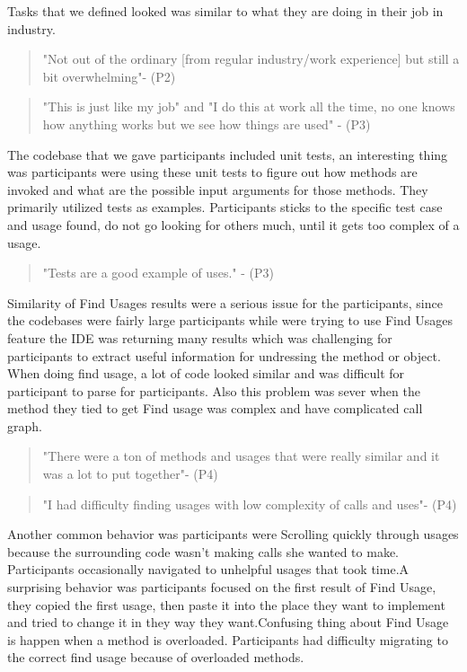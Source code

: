 \documentclass[conference]{IEEEtran}
\begin{document}
Tasks that we defined looked was similar to what they are doing in their job in industry. 
\begin{quote}
"Not out of the ordinary [from regular industry/work experience] but still a bit overwhelming"- (P2)
\end{quote}
\begin{quote} "This is just like my job" and "I do this at work all the time, no one knows how anything works but we see how things are used"
- (P3)
\end{quote}
The codebase that we gave participants included unit tests, an interesting thing was participants were using these unit tests to figure out how methods are invoked and what are the possible input arguments for those methods. They primarily utilized tests as examples. Participants sticks to the specific test case and usage found, do not go looking for others much, until it gets too complex of a usage.
\begin{quote} "Tests are a good example of uses." - (P3)\end{quote}
Similarity of Find Usages results were a serious issue for the participants, since the codebases were fairly large participants while were trying to use Find Usages feature the IDE was returning many results which was challenging for participants to extract useful information for undressing the method or object. When doing find usage, a lot of code looked similar and was difficult for participant to parse for participants. Also this problem was sever when the method they tied to get Find usage was complex and have complicated call graph.
\begin{quote}"There were a ton of methods and usages that were really similar and it was a lot to put together"- (P4)\end{quote}
\begin{quote}"I had difficulty finding usages with low complexity of calls and uses"- (P4)\end{quote}
Another common behavior was participants were Scrolling quickly through usages because the surrounding code wasn't making calls she wanted to make. Participants occasionally navigated to unhelpful usages that took time.A surprising behavior was participants focused on the first result of Find Usage, they copied the first usage, then paste it into the place they want to implement and tried to change it in they way they want.Confusing thing about Find Usage is happen when a method is overloaded. Participants had difficulty migrating to the correct find usage because of overloaded methods.
\end{document}
